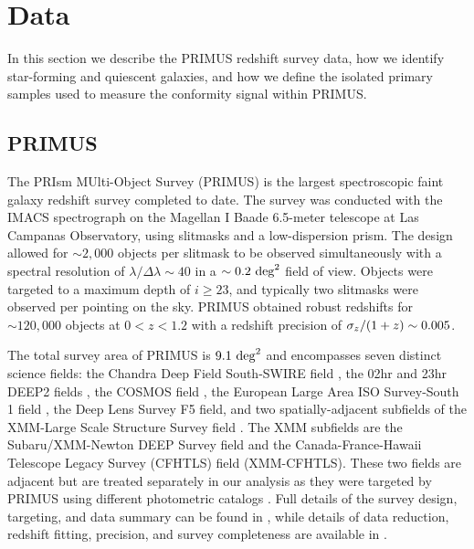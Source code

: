 
\section{Data}\label{sec:data}

In this section we describe the PRIMUS redshift survey data, how we identify star-forming
and quiescent galaxies, and how we define the isolated primary samples used to measure 
the conformity signal within PRIMUS.

\subsection{PRIMUS}\label{sec:PRIMUS}
 
The PRIsm MUlti-Object Survey (PRIMUS) is the largest spectroscopic faint galaxy redshift survey completed to date.
The survey was conducted with the IMACS spectrograph \citep{Bigelow03} on the Magellan I Baade 6.5-meter telescope at 
Las Campanas 
Observatory, using slitmasks and a low-dispersion prism.
The design allowed for $\sim2,000$ objects per slitmask to be observed simultaneously with a spectral resolution of ${\lambda/\Delta
\lambda \sim 40}$ in a $\sim0.2~\degsq$ field of view.
Objects were targeted to a maximum depth of ${i \ge 23}$, and typically two slitmasks were observed per pointing on the sky.  
PRIMUS obtained robust redshifts \citep[${Q \ge 3}$; see][]{Cool13} for $\sim120,000$ objects at ${0<z<1.2}$ with a 
redshift precision of ${\sigmaz/(1 + z) \sim 0.005}$.

The total survey area of PRIMUS is $9.1~\degsq$ and encompasses seven distinct science fields:
the Chandra Deep Field South-SWIRE field \citep[CDFS;][]{Lonsdale03},
the 02hr and 23hr DEEP2 fields \citep{Newman13},
the COSMOS field \citep{Scoville07},
the European Large Area ISO Survey-South 1 field \citep[ES1;][]{Oliver00},
the Deep Lens Survey \citep[DLS;][]{Wittman02} F5 field,
and two spatially-adjacent subfields of the XMM-Large Scale Structure Survey field \citep[XMM-LSS;][]{Pierre04}.
The XMM subfields are the Subaru/XMM-Newton DEEP Survey field \citep[XMM-SXDS;][]{Furusawa08} and the Canada-France-Hawaii 
Telescope Legacy 
Survey (CFHTLS) field (XMM-CFHTLS).
These two fields are adjacent but are treated separately in our analysis 
as they were targeted by PRIMUS using different photometric catalogs \citep{Coil11}.
Full details of the survey design, targeting, and data summary can be found in \citet{Coil11}, while details of data reduction, redshift 
fitting, precision, 
and survey completeness are available in \citet{Cool13}.

